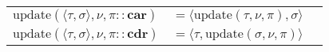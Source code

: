 \documentclass{article}
\newcommand{\pairtype}[2]{\langle #1 , #2 \rangle}
\newcommand{\update}[3]{\textrm{update}(#1, #2, #3)}
\begin{document}
\begin{figure}
  \begin{tabular}{l l r}
    $ \update{\pairtype{ \tau }{ \sigma }}{\nu}{\pi :: \mathbf{car}} $ 
      & $ = \pairtype{\update{\tau}{\nu}{\pi}}{\sigma} $ & \\
    $ \update{\pairtype{ \tau }{ \sigma }}{\nu}{\pi :: \mathbf{cdr}} $ 
      & $ = \pairtype{\tau}{\update{\sigma}{\nu}{\pi}} $ & \\
    
  \end{tabular}
\end{figure}
\end{document}
